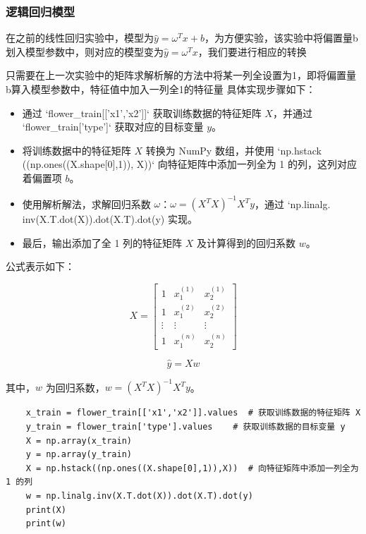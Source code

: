 \documentclass[12pt,a4paper,oneside]{article}
\begin{document}
\subsubsection{逻辑回归模型}

在之前的线性回归实验中，模型为$\hat{y}=\omega^T x+b$，为方便实验，该实验中将偏置量b划入模型参数中，则对应的模型变为$\hat{y}=\omega^Tx$，我们要进行相应的转换 

只需要在上一次实验中的矩阵求解析解的方法中将某一列全设置为1，即将偏置量b算入模型参数中，特征值中加入一列全1的特征量
具体实现步骤如下：

\begin{itemize}
    \item 通过 `flower\_train[['x1','x2']]` 获取训练数据的特征矩阵 $X$，并通过 `flower\_train['type']` 获取对应的目标变量 $y$。
    \item 将训练数据中的特征矩阵 $X$ 转换为 NumPy 数组，并使用 `np.hstack
    ((np.ones((X.shape[0],1)), X))` 向特征矩阵中添加一列全为 1 的列，这列对应着偏置项 $b$。
    \item 使用解析解法，求解回归系数 $\omega$：$\omega = (X^T X)^{-1} X^T y$，通过 `np.linalg.
    inv(X.T.dot(X)).dot(X.T).dot(y) 实现。
    \item 最后，输出添加了全 1 列的特征矩阵 $X$ 及计算得到的回归系数 $w$。
\end{itemize}

公式表示如下：

\[
X = \begin{bmatrix} 
1 & x_{1}^{(1)} & x_{2}^{(1)} \\
1 & x_{1}^{(2)} & x_{2}^{(2)} \\
\vdots & \vdots & \vdots \\
1 & x_{1}^{(n)} & x_{2}^{(n)} 
\end{bmatrix}
\]

\[
\hat{y} = Xw
\]

其中，$w$ 为回归系数，$w = \left( X^T X \right)^{-1} X^T y$。

\begin{lstlisting}
    x_train = flower_train[['x1','x2']].values  # 获取训练数据的特征矩阵 X
    y_train = flower_train['type'].values    # 获取训练数据的目标变量 y
    X = np.array(x_train)  
    y = np.array(y_train)
    X = np.hstack((np.ones((X.shape[0],1)),X))  # 向特征矩阵中添加一列全为 1 的列
    w = np.linalg.inv(X.T.dot(X)).dot(X.T).dot(y)
    print(X)
    print(w)
\end{lstlisting}
\end{document}

